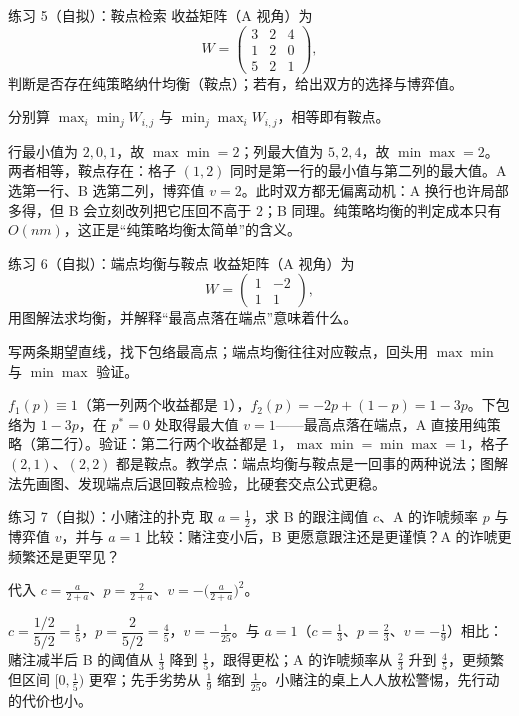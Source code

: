 \begin{problem}{练习 5（自拟）：鞍点检索}
收益矩阵（A 视角）为
\[
 W=\begin{pmatrix}3&2&4\\1&2&0\\5&2&1\end{pmatrix},
\]
判断是否存在纯策略纳什均衡（鞍点）；若有，给出双方的选择与博弈值。
\end{problem}

\hint 分别算 $\max_i\min_j W_{i,j}$ 与 $\min_j\max_i W_{i,j}$，相等即有鞍点。

\sol 行最小值为 $2,0,1$，故 $\max\min=2$；列最大值为 $5,2,4$，故 $\min\max=2$。两者相等，鞍点存在：格子 $(1,2)$ 同时是第一行的最小值与第二列的最大值。A 选第一行、B 选第二列，博弈值 $v=2$。此时双方都无偏离动机：A 换行也许局部多得，但 B 会立刻改列把它压回不高于 $2$；B 同理。纯策略均衡的判定成本只有 $O(nm)$，这正是“纯策略均衡太简单”的含义。

\begin{problem}{练习 6（自拟）：端点均衡与鞍点}
收益矩阵（A 视角）为
\[
 W=\begin{pmatrix}1&-2\\1&1\end{pmatrix},
\]
用图解法求均衡，并解释“最高点落在端点”意味着什么。
\end{problem}

\hint 写两条期望直线，找下包络最高点；端点均衡往往对应鞍点，回头用 $\max\min$ 与 $\min\max$ 验证。

\sol $f_1(p)\equiv1$（第一列两个收益都是 $1$），$f_2(p)=-2p+(1-p)=1-3p$。下包络为 $1-3p$，在 $p^{*}=0$ 处取得最大值 $v=1$——最高点落在端点，A 直接用纯策略（第二行）。验证：第二行两个收益都是 $1$，$\max\min=\min\max=1$，格子 $(2,1)$、$(2,2)$ 都是鞍点。教学点：端点均衡与鞍点是一回事的两种说法；图解法先画图、发现端点后退回鞍点检验，比硬套交点公式更稳。

\begin{problem}{练习 7（自拟）：小赌注的扑克}
取 $a=\tfrac12$，求 B 的跟注阈值 $c$、A 的诈唬频率 $p$ 与博弈值 $v$，并与 $a=1$ 比较：赌注变小后，B 更愿意跟注还是更谨慎？A 的诈唬更频繁还是更罕见？
\end{problem}

\hint 代入 $c=\tfrac{a}{2+a}$、$p=\tfrac{2}{2+a}$、$v=-\bigl(\tfrac{a}{2+a}\bigr)^{2}$。

\sol $c=\dfrac{1/2}{5/2}=\tfrac15$，$p=\dfrac{2}{5/2}=\tfrac45$，$v=-\tfrac1{25}$。与 $a=1$（$c=\tfrac13$、$p=\tfrac23$、$v=-\tfrac19$）相比：赌注减半后 B 的阈值从 $\tfrac13$ 降到 $\tfrac15$，跟得更松；A 的诈唬频率从 $\tfrac23$ 升到 $\tfrac45$，更频繁但区间 $[0,\tfrac15)$ 更窄；先手劣势从 $\tfrac19$ 缩到 $\tfrac1{25}$。小赌注的桌上人人放松警惕，先行动的代价也小。

